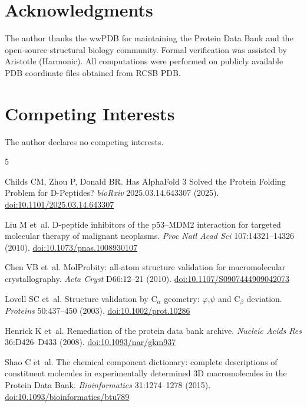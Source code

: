 \documentclass[11pt]{article}
\begin{document}
\section*{Acknowledgments}

The author thanks the wwPDB for maintaining the Protein Data Bank and the open-source structural biology community. Formal verification was assisted by Aristotle (Harmonic). All computations were performed on publicly available PDB coordinate files obtained from RCSB PDB.

\section*{Competing Interests}

The author declares no competing interests.

\begin{thebibliography}{5}

Childs CM, Zhou P, Donald BR.
\newblock Has AlphaFold 3 Solved the Protein Folding Problem for D-Peptides?
\newblock \textit{bioRxiv} 2025.03.14.643307 (2025).
\newblock \href{https://doi.org/10.1101/2025.03.14.643307}{doi:10.1101/2025.03.14.643307}

Liu M et~al.
\newblock D-peptide inhibitors of the p53--MDM2 interaction for targeted molecular therapy of malignant neoplasms.
\newblock \textit{Proc Natl Acad Sci} 107:14321--14326 (2010).
\newblock \href{https://doi.org/10.1073/pnas.1008930107}{doi:10.1073/pnas.1008930107}

Chen VB et~al.
\newblock MolProbity: all-atom structure validation for macromolecular crystallography.
\newblock \textit{Acta Cryst} D66:12--21 (2010).
\newblock \href{https://doi.org/10.1107/S0907444909042073}{doi:10.1107/S0907444909042073}

Lovell SC et~al.
\newblock Structure validation by C$_\alpha$ geometry: $\varphi$,$\psi$ and C$_\beta$ deviation.
\newblock \textit{Proteins} 50:437--450 (2003).
\newblock \href{https://doi.org/10.1002/prot.10286}{doi:10.1002/prot.10286}

Henrick K et~al.
\newblock Remediation of the protein data bank archive.
\newblock \textit{Nucleic Acids Res} 36:D426--D433 (2008).
\newblock \href{https://doi.org/10.1093/nar/gkm937}{doi:10.1093/nar/gkm937}

Shao C et~al.
\newblock The chemical component dictionary: complete descriptions of constituent molecules in experimentally determined 3D macromolecules in the Protein Data Bank.
\newblock \textit{Bioinformatics} 31:1274--1278 (2015).
\newblock \href{https://doi.org/10.1093/bioinformatics/btu789}{doi:10.1093/bioinformatics/btu789}


\end{thebibliography}
\end{document}
